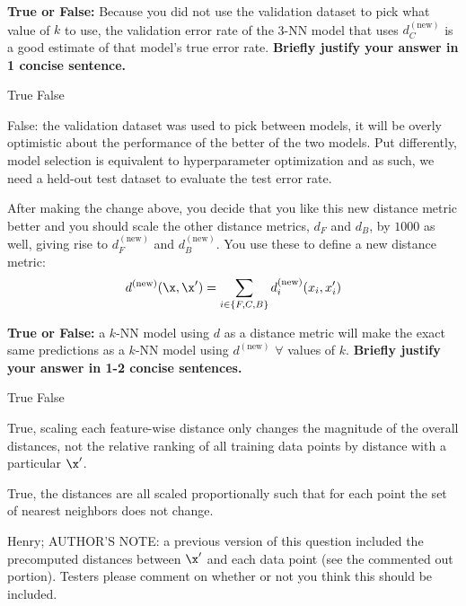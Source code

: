 \begin{parts}
\begin{subparts}
    \subpart[2] \textbf{True or False:} Because you did not use the validation dataset to pick what value of $k$ to use, the validation error rate of the 3-NN model that uses $d_C^{(\textrm{new})}$ is a good estimate of that model's true error rate. \textbf{Briefly justify your answer in 1 concise sentence.}
    \begin{checkboxes}
        \choice True
        \choice False
    \end{checkboxes}
    \fillwithlines{6em}
    \begin{soln}
        False: the validation dataset was used to pick between models, it will be overly optimistic about the performance of the better of the two models. Put differently, model selection is equivalent to hyperparameter optimization and as such, we need a held-out test dataset to evaluate the test error rate. 
    \end{soln}
        
\clearpage

\begin{EnvFullwidth}    
    After making the change above, you decide that you like this new distance metric better and you should scale the other distance metrics, $d_F$ and $d_B$, by $1000$ as well, giving rise to $d_F^{(\textrm{new})}$ and $d_B^{(\textrm{new})}$. You use these to define a new distance metric:
    \[
        d^{(\textrm{new})}(\x, \x') = \sum_{i \in \{F, C, B\}} d_i^{(\textrm{new})}(x_i, x_i')
    \]
\end{EnvFullwidth}

    \subpart[2] \textbf{True or False:} a $k$-NN model using $d$ as a distance metric will make the exact same predictions as a $k$-NN model using $d^{(\textrm{new})}$ $\forall$ values of $k$. \textbf{Briefly justify your answer in 1-2 concise sentences.}
    \begin{checkboxes}
        \choice True
        \choice False
    \end{checkboxes}
    \fillwithlines{6em}
    \begin{soln}
        True, scaling each feature-wise distance only changes the magnitude of the overall distances, not the relative ranking of all training data points by distance with a particular $\x'$.
        
        True, the distances are all scaled proportionally such that for each point the set of nearest neighbors does not change.
    \end{soln}
\end{subparts}
\begin{qauthor}   
    Henry; AUTHOR'S NOTE: a previous version of this question included the precomputed distances between $\x'$ and each data point (see the commented out portion). Testers please comment on whether or not you think this should be included. 
\end{qauthor}


\end{parts}

